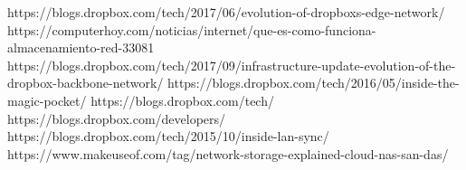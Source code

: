 \newpage
\begin{thebibliography}{9}
 https://blogs.dropbox.com/tech/2017/06/evolution-of-dropboxs-edge-network/
\bibitem{} https://computerhoy.com/noticias/internet/que-es-como-funciona-almacenamiento-red-33081 
\bibitem{} https://blogs.dropbox.com/tech/2017/09/infrastructure-update-evolution-of-the-dropbox-backbone-network/
\bibitem{} https://blogs.dropbox.com/tech/2016/05/inside-the-magic-pocket/
\bibitem{} https://blogs.dropbox.com/tech/
\bibitem{} https://blogs.dropbox.com/developers/
\bibitem{} https://blogs.dropbox.com/tech/2015/10/inside-lan-sync/
\bibitem{}  https://www.makeuseof.com/tag/network-storage-explained-cloud-nas-san-das/
\end{thebibliography}

